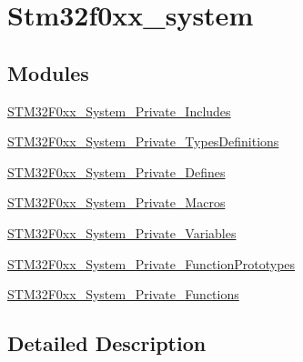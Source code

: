 \hypertarget{group__stm32f0xx__system}{}\section{Stm32f0xx\+\_\+system}
\label{group__stm32f0xx__system}
\subsection*{Modules}
\begin{DoxyCompactItemize}
\item 
\hyperlink{group___s_t_m32_f0xx___system___private___includes}{S\+T\+M32\+F0xx\+\_\+\+System\+\_\+\+Private\+\_\+\+Includes}
\item 
\hyperlink{group___s_t_m32_f0xx___system___private___types_definitions}{S\+T\+M32\+F0xx\+\_\+\+System\+\_\+\+Private\+\_\+\+Types\+Definitions}
\item 
\hyperlink{group___s_t_m32_f0xx___system___private___defines}{S\+T\+M32\+F0xx\+\_\+\+System\+\_\+\+Private\+\_\+\+Defines}
\item 
\hyperlink{group___s_t_m32_f0xx___system___private___macros}{S\+T\+M32\+F0xx\+\_\+\+System\+\_\+\+Private\+\_\+\+Macros}
\item 
\hyperlink{group___s_t_m32_f0xx___system___private___variables}{S\+T\+M32\+F0xx\+\_\+\+System\+\_\+\+Private\+\_\+\+Variables}
\item 
\hyperlink{group___s_t_m32_f0xx___system___private___function_prototypes}{S\+T\+M32\+F0xx\+\_\+\+System\+\_\+\+Private\+\_\+\+Function\+Prototypes}
\item 
\hyperlink{group___s_t_m32_f0xx___system___private___functions}{S\+T\+M32\+F0xx\+\_\+\+System\+\_\+\+Private\+\_\+\+Functions}
\end{DoxyCompactItemize}


\subsection{Detailed Description}
